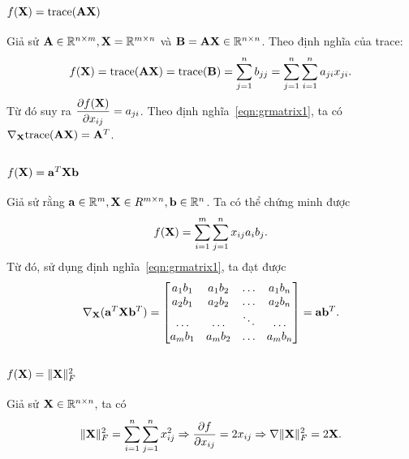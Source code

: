 \subsection{$f(\mathbf{X}) = \text{trace}(\mathbf{A}\mathbf{X})$}
Giả sử $\mathbf{A} \in \mathbb{R}^{n\times m}, \mathbf{X} = \mathbb{R}^{m\times n}$ và $\mathbf{B} = \mathbf{A}\mathbf{X} \in \mathbb{R}^
{n \times n}$. Theo định nghĩa của trace:
\begin{equation}
f(\mathbf{X}) = \text{trace}(\mathbf{A}\mathbf{X}) = \text{trace}(\mathbf{B}) = \sum_{j = 1}^n {b_{jj}} =
\sum_{j=1}^n\sum_{i=1}^n a_{ji}x_{ji}.
\end{equation}
Từ đó suy ra $\displaystyle\frac{\partial f(\mathbf{X})}{\partial x_{ij}} =
a_{ji}$. Theo định nghĩa~\eqref{eqn:grmatrix1}, ta có $\nabla_{\mathbf{X}}\text{trace}(\mathbf{A}\mathbf{X}) =
\mathbf{A}^T$.

\subsection{$f(\mathbf{X}) = \mathbf{a}^T\mathbf{X}\mathbf{b}$}
Giả sử rằng $\mathbf{a} \in \mathbb{R}^{m}, \mathbf{X} \in R^{m\times n}, \mathbf{b} \in \mathbb{R}^{n}$. Ta có
thể chứng minh được $$f(\mathbf{X}) = \sum_{i=1}^m \sum_{j=1}^n x_{ij}a_ib_j.$$
Từ đó, sử dụng định nghĩa~\eqref{eqn:grmatrix1}, ta đạt được
\begin{equation}
\nabla_{\mathbf{X}}(\mathbf{a}^T\mathbf{X}\mathbf{b}^T) = \left[\begin{matrix}
a_1b_1 &  a_1b_2 & \dots &a_1b_n \\
a_2b_1 &  a_2b_2 & \dots &a_2b_n \\
\dots & \dots & \ddots & \dots \\
a_mb_1 &  a_mb_2 & \dots &a_mb_n \\
\end{matrix}\right]
= \mathbf{a}\mathbf{b}^T.
\end{equation}


\subsection{$f(\mathbf{X}) = \|\mathbf{X}\|_F^2$}
Giả sử $\mathbf{X} \in \mathbb{R}^{n\times n}$, ta có
$$
\|\mathbf{X}\|_F^2 =
\sum_{i=1}^n\sum_{j=1}^n x_{ij}^2 \Rightarrow \frac{\partial f}{\partial x_{ij}} = 2x_{ij} \Rightarrow \nabla \|\mathbf{X}\|_F^2 = 2\mathbf{X}.
$$


